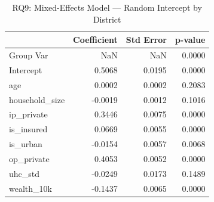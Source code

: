 \begin{table}
\caption{RQ9: Mixed-Effects Model — Random Intercept by District}
\label{tab:rq9_mixed}
\begin{tabular}{lrrr}
\toprule
 & Coefficient & Std Error & p-value \\
\midrule
Group Var & NaN & NaN & 0.0000 \\
Intercept & 0.5068 & 0.0195 & 0.0000 \\
age & 0.0002 & 0.0002 & 0.2083 \\
household_size & -0.0019 & 0.0012 & 0.1016 \\
ip_private & 0.3446 & 0.0075 & 0.0000 \\
is_insured & 0.0669 & 0.0055 & 0.0000 \\
is_urban & -0.0154 & 0.0057 & 0.0068 \\
op_private & 0.4053 & 0.0052 & 0.0000 \\
uhc_std & -0.0249 & 0.0173 & 0.1489 \\
wealth_10k & -0.1437 & 0.0065 & 0.0000 \\
\bottomrule
\end{tabular}
\end{table}
